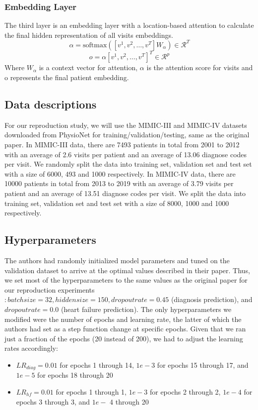 \documentclass[11pt,a4paper,fleqn]{article}
\begin{document}
\subsubsection{Embedding Layer}
The third layer is an embedding layer with a location-based attention to
calculate the final hidden representation of all visits embeddings.
\begin{equation}
  \alpha=\textrm{softmax}([v^1,v^2,\dots, v^T]W_\alpha)\in \mathcal{R}^T
\end{equation}
\begin{equation}
  o=\alpha[v^1,v^2,\dots, v^T]^T\in\mathcal{R}^p
\end{equation}
Where $W_\alpha$ is a context vector for attention, $\alpha$ is the attention
score for visits and o represents the final patient embedding.

\subsection{Data descriptions}
For our reproduction study, we will use the MIMIC-III \cite{mimic3} and
MIMIC-IV \cite{mimic4} datasets downloaded from PhysioNet \cite{physionet} for
training/validation/testing, same as the original paper. In MIMIC-III data,
there are 7493 patients in total from 2001 to 2012 with an average of 2.6 visits
per patient and an average of 13.06 diagnose codes per visit. We randomly split
the data into training set, validation set and test set with a size of 6000, 493
and 1000 respectively. In MIMIC-IV data, there are 10000 patients in total from
2013 to 2019 with an average of 3.79 visits per patient and an average of 13.51
diagnose codes per visit. We split the data into training set, validation set
and test set with a size of 8000, 1000 and 1000 respectively. 

\subsection{Hyperparameters}
The authors had randomly initialized model parameters and tuned on the
validation dataset to arrive at the optimal values described in their paper.
Thus, we set most of the hyperparameters to the same values as the original 
paper for our reproduction experiments$: batch size = 32, hidden size = 150,
dropout rate = 0.45$ (diagnosis prediction), and $dropout rate = 0.0$ (heart
failure prediction). The only hyperparameters we modified were the number of
epochs and learning rate, the latter of which the authors had set as a step
function change at specific epochs. Given that we ran just a fraction of the
epochs (20 instead of 200), we had to adjust the learning rates accordingly: 
\begin{itemize}
  \item $LR_{diag} = 0.01$ for epochs 1 through 14,
  $1e-3$ for epochs 15 through 17, and $1e-5$ for epochs 18 through 20
  \item $LR_{hf} = 0.01$ for epochs 1 through
  1, $1e-3$ for epochs 2 through 2, $1e-4$ for epochs 3 through 3, and $1e-$ 4
  through 20
\end{itemize}
\end{document}
